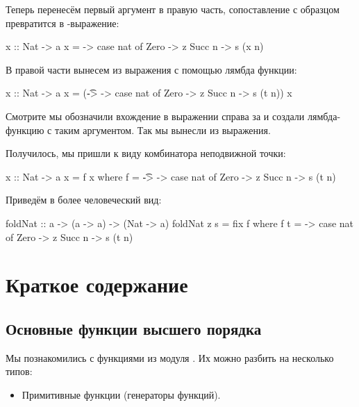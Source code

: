 Теперь перенесём первый аргумент в правую часть, сопоставление с
образцом превратится в -выражение:


\begin{code}
x :: Nat -> a
x = \nat -> case nat of
                Zero    -> z
                Succ n  -> s (x n)
\end{code}

В правой части вынесем  из выражения с помощью лямбда функции:


\begin{code}
x :: Nat -> a
x = (\t -> \nat -> case nat of
                        Zero    -> z
                        Succ n  -> s (t n)) x 
\end{code}

Смотрите мы обозначили вхождение  в выражении справа за  и
создали лямбда-функцию с таким аргументом. Так мы вынесли  из
выражения.

Получилось, мы пришли к виду комбинатора неподвижной точки:


\begin{code}
x :: Nat -> a
x = f x
    where f = \t -> \nat -> case nat of
                        Zero    -> z
                        Succ n  -> s (t n)
\end{code}

Приведём в более человеческий вид:


\begin{code}
foldNat :: a -> (a -> a) -> (Nat -> a)
foldNat z s = fix f
    where f t = \nat -> case nat of
                            Zero    -> z
                            Succ n  -> s (t n)
\end{code}

\section{Краткое содержание}

\subsection{Основные функции высшего порядка}

Мы познакомились с функциями из модуля . Их можно
разбить на несколько типов:

\begin{itemize}
\item
  Примитивные функции (генераторы функций).
\end{itemize}


